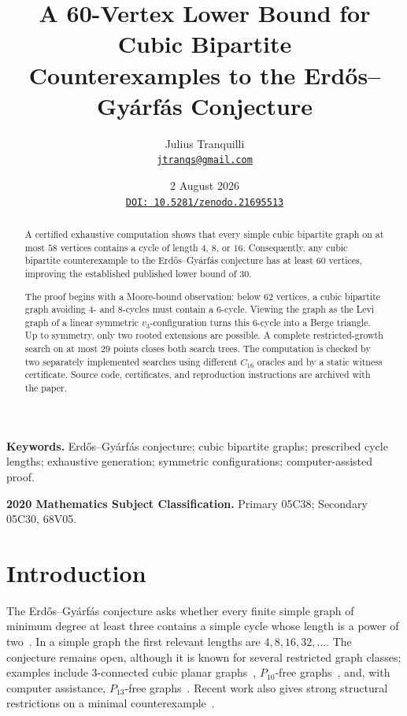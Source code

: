 \documentclass[11pt]{article}
\title{A 60-Vertex Lower Bound for Cubic Bipartite\\
Counterexamples to the Erd\H{o}s--Gy\'arf\'as Conjecture}
\author{Julius Tranquilli\\
\small\href{mailto:jtranqs@gmail.com}{\texttt{jtranqs@gmail.com}}}
\date{2 August 2026\\[0.5ex]
\small\href{https://doi.org/10.5281/zenodo.21695513}
{\texttt{DOI: 10.5281/zenodo.21695513}}}
\theoremstyle{definition}
\begin{document}
\maketitle

\begin{abstract}
A certified exhaustive computation shows that every simple cubic bipartite
graph on at most \(58\) vertices contains a cycle of length \(4\), \(8\), or
\(16\). Consequently, any cubic bipartite counterexample to the
Erd\H{o}s--Gy\'arf\'as conjecture has at least \(60\) vertices, improving the
established published lower bound of \(30\).

The proof begins with a Moore-bound observation: below \(62\) vertices, a
cubic bipartite graph avoiding \(4\)- and \(8\)-cycles must contain a
\(6\)-cycle. Viewing the graph as the Levi graph of a linear symmetric
\(v_3\)-configuration turns this \(6\)-cycle into a Berge triangle. Up to
symmetry, only two rooted extensions are possible. A complete
restricted-growth search on at most \(29\) points closes both search trees.
The computation is checked by two separately implemented searches using
different \(C_{16}\) oracles and by a static witness certificate. Source code,
certificates, and reproduction instructions are archived with the paper.
\end{abstract}

\noindent\textbf{Keywords.} Erd\H{o}s--Gy\'arf\'as conjecture; cubic bipartite
graphs; prescribed cycle lengths; exhaustive generation; symmetric
configurations; computer-assisted proof.

\medskip
\noindent\textbf{2020 Mathematics Subject Classification.} Primary 05C38;
Secondary 05C30, 68V05.

\section{Introduction}

The Erd\H{o}s--Gy\'arf\'as conjecture asks whether every finite simple graph
of minimum degree at least three contains a simple cycle whose length is a
power of two~\cite{Erdos1997}.  In a simple graph the first relevant lengths
are \(4,8,16,32,\ldots\).  The conjecture remains open, although it is known
for several restricted graph classes; examples include \(3\)-connected cubic
planar graphs~\cite{HeckmanKrakovski2013}, \(P_{10}\)-free
graphs~\cite{HuShen2024}, and, with computer assistance, \(P_{13}\)-free
graphs~\cite{HegdeSandeepShashank2025}.  Recent work also gives strong
structural restrictions on a minimal counterexample~\cite{Carr2026}.
\end{document}
